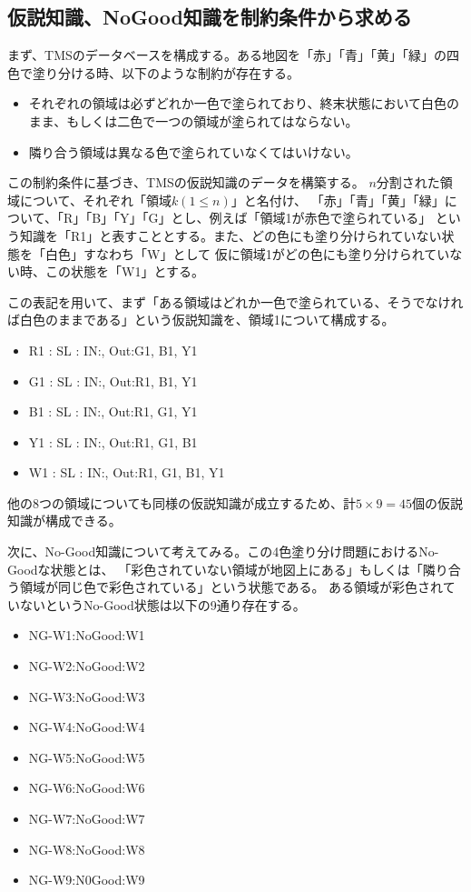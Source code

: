 \documentclass[uplatex]{jsarticle}
\begin{document}
\subsection{仮説知識、NoGood知識を制約条件から求める}
まず、TMSのデータベースを構成する。ある地図を「赤」「青」「黄」「緑」の四色で塗り分ける時、以下のような制約が存在する。
\begin{itemize}
  \item それぞれの領域は必ずどれか一色で塗られており、終末状態において白色のまま、もしくは二色で一つの領域が塗られてはならない。
  \item 隣り合う領域は異なる色で塗られていなくてはいけない。
\end{itemize}
この制約条件に基づき、TMSの仮説知識のデータを構築する。
$n$分割された領域について、それぞれ「領域$k(1 \leq n)$」と名付け、
「赤」「青」「黄」「緑」について、「R」「B」「Y」「G」とし、例えば「領域1が赤色で塗られている」
という知識を「R1」と表すこととする。また、どの色にも塗り分けられていない状態を「白色」すなわち「W」として
仮に領域1がどの色にも塗り分けられていない時、この状態を「W1」とする。

この表記を用いて、まず「ある領域はどれか一色で塗られている、そうでなければ白色のままである」という仮説知識を、領域1について構成する。
\begin{itemize}
  \item R1 : SL : {IN:{}, Out:{G1, B1, Y1}}
  \item G1 : SL : {IN:{}, Out:{R1, B1, Y1}}
  \item B1 : SL : {IN:{}, Out:{R1, G1, Y1}}
  \item Y1 : SL : {IN:{}, Out:{R1, G1, B1}}
  \item W1 : SL : {IN:{}, Out:{R1, G1, B1, Y1}}
\end{itemize}
他の8つの領域についても同様の仮説知識が成立するため、計$5\times9 = 45$個の仮説知識が構成できる。

次に、No-Good知識について考えてみる。この4色塗り分け問題におけるNo-Goodな状態とは、
「彩色されていない領域が地図上にある」もしくは「隣り合う領域が同じ色で彩色されている」という状態である。
ある領域が彩色されていないというNo-Good状態は以下の9通り存在する。
\begin{itemize}
  \item NG-W1:{NoGood:{W1}}
  \item NG-W2:{NoGood:{W2}}
  \item NG-W3:{NoGood:{W3}}
  \item NG-W4:{NoGood:{W4}}
  \item NG-W5:{NoGood:{W5}}
  \item NG-W6:{NoGood:{W6}}
  \item NG-W7:{NoGood:{W7}}
  \item NG-W8:{NoGood:{W8}}
  \item NG-W9:{N0Good:{W9}}
\end{itemize}
\end{document}
